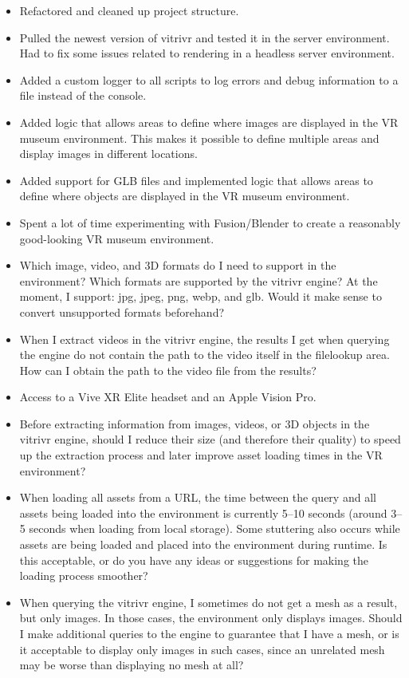 \documentclass{article}
\begin{document}
\done
\begin{itemize}
    \item Refactored and cleaned up project structure.
    \item Pulled the newest version of vitrivr and tested it in the server environment. Had to fix some issues related to rendering in a headless server environment.
    \item Added a custom logger to all scripts to log errors and debug information to a file instead of the console.
    \item Added logic that allows areas to define where images are displayed in the VR museum environment. This makes it possible to define multiple areas and display images in different locations.
    \item Added support for GLB files and implemented logic that allows areas to define where objects are displayed in the VR museum environment.
    \item Spent a lot of time experimenting with Fusion/Blender to create a reasonably good-looking VR museum environment.
\end{itemize}

\support
\begin{itemize}
    \item Which image, video, and 3D formats do I need to support in the environment? Which formats are supported by the vitrivr engine?
    At the moment, I support: jpg, jpeg, png, webp, and glb. Would it make sense to convert unsupported formats beforehand?
    \item When I extract videos in the vitrivr engine, the results I get when querying the engine do not contain the path to the video itself in the filelookup area. How can I obtain the path to the video file from the results?
    \item Access to a Vive XR Elite headset and an Apple Vision Pro.
    \item Before extracting information from images, videos, or 3D objects in the vitrivr engine, should I reduce their size (and therefore their quality) to speed up the extraction process and later improve asset loading times in the VR environment?
    \item When loading all assets from a URL, the time between the query and all assets being loaded into the environment is currently 5--10 seconds (around 3--5 seconds when loading from local storage). Some stuttering also occurs while assets are being loaded and placed into the environment during runtime. Is this acceptable, or do you have any ideas or suggestions for making the loading process smoother?
    \item When querying the vitrivr engine, I sometimes do not get a mesh as a result, but only images. In those cases, the environment only displays images. Should I make additional queries to the engine to guarantee that I have a mesh, or is it acceptable to display only images in such cases, since an unrelated mesh may be worse than displaying no mesh at all?
\end{itemize}

\plan
{}
\end{document}
